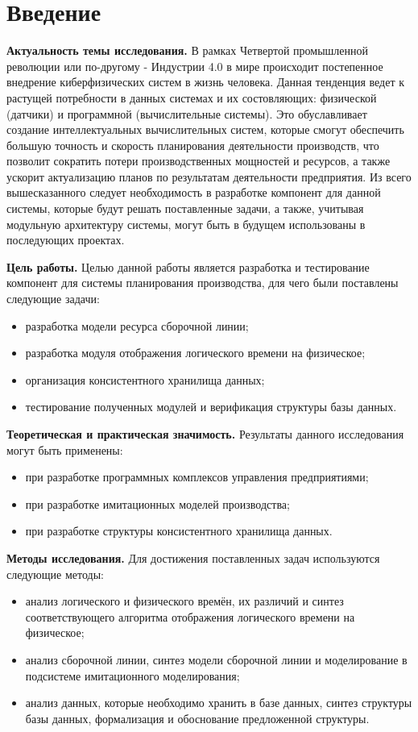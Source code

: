 \section*{Введение}
\indent \textbf{Актуальность темы исследования.}
В рамках Четвертой промышленной революции или по-другому - Индустрии 4.0 в мире происходит постепенное внедрение киберфизических систем в жизнь человека.
Данная тенденция ведет к растущей потребности в данных системах и их состовляющих: физической (датчики) и программной (вычислительные системы).
Это обуславливает создание интеллектуальных вычислительных систем, которые смогут обеспечить большую точность и скорость планирования деятельности производств, что позволит сократить потери производственных мощностей и ресурсов, а также ускорит актуализацию планов по результатам деятельности предприятия.
Из всего вышесказанного следует необходимость в разработке компонент для данной системы, которые будут решать поставленные задачи, а также, учитывая модульную архитектуру системы, могут быть в будущем использованы в последующих проектах.


\indent \textbf{Цель работы.} 
Целью данной работы является разработка и тестирование компонент для системы планирования производства, для чего были поставлены следующие задачи:
\begin{itemize}
	\item разработка модели ресурса сборочной линии;
	\item разработка модуля отображения логического времени на физическое;
	\item организация консистентного хранилища данных;
	\item тестирование полученных модулей и верификация структуры базы данных.
\end{itemize}

\indent \textbf{Теоретическая и практическая значимость.}
Результаты данного исследования могут быть применены:
\begin{itemize}
	\item при разработке программных комплексов управления предприятиями;
	\item при разработке имитационных моделей производства;
	\item при разработке структуры консистентного хранилища данных.
\end{itemize}

\indent \textbf{Методы исследования.}
Для достижения поставленных задач используются следующие методы:
\begin{itemize}
	\item анализ логического и физического времён, их различий и синтез соответствующего алгоритма отображения логического времени на физическое;
	\item анализ сборочной линии, синтез модели сборочной линии и моделирование в подсистеме имитационного моделирования;
	\item анализ данных, которые необходимо хранить в базе данных, синтез структуры базы данных, формализация и обоснование предложенной структуры.
\end{itemize}

